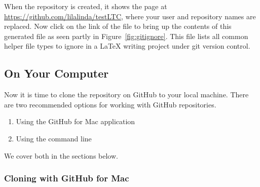 When the repository is created, it shows the page at \url{https://github.com/lilalinda/testLTC}, where your user and repository names are replaced.  Now click on the link of the file  to bring up the contents of this generated file as seen partly in Figure~\ref{fig:gitignore}.  This file lists all common helper file types to ignore in a LaTeX writing project under git version control.

\subsection{On Your Computer}

Now it is time to clone the repository on GitHub to your local machine.  There are two recommended options for working with GitHub repositories.
\begin{enumerate}
\item Using the GitHub for Mac application 
\item Using the command line
\end{enumerate}
We cover both in the sections below.

\subsubsection{Cloning with GitHub for Mac}

